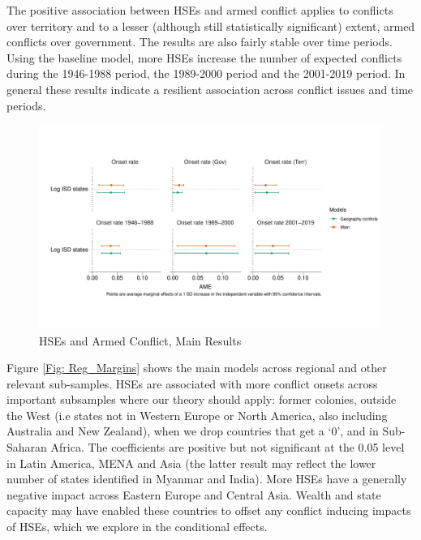 The positive association between HSEs and armed conflict applies to conflicts
over territory and to a lesser (although still statistically significant)
extent, armed conflicts over government. The results are also fairly stable over
time periods. Using the baseline model, more HSEs increase the number of
expected conflicts during the 1946-1988 period, the 1989-2000 period and the
2001-2019 period. In general these results
indicate a resilient association across conflict issues and time
periods. 

\begin{figure}[!htb]
	\includegraphics[width=\textwidth]{img/main_margins.pdf}
	\caption{HSEs and Armed Conflict, Main Results} 
	\label{Fig: Main_Margins}
\end{figure}

Figure \ref{Fig: Reg_Margins} shows the main models across regional and other
relevant sub-samples. HSEs are associated with more conflict onsets across
important subsamples where our theory should apply: former colonies, outside the
West (i.e states not in Western Europe or North America, also including
Australia and New Zealand), when we drop countries that get a `0', and in
Sub-Saharan Africa. The coefficients are positive but not significant at the
0.05 level in Latin America, MENA and Asia (the latter result may reflect the
lower number of states identified in Myanmar and India). More HSEs have a
generally negative impact across Eastern Europe and Central Asia. Wealth and
state capacity may have enabled these countries to offset any conflict inducing
impacts of HSEs, which we explore in the conditional effects. 


